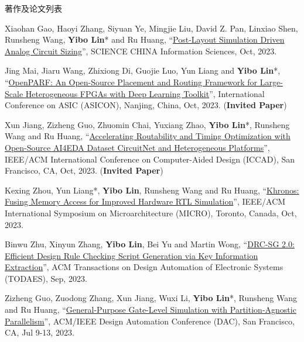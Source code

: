 \begin{rSection}{著作及论文列表}
\begin{description}[font=\normalfont, rightmargin=2em]
{}
            

\item[{[J127]}]{
        Xiaohan Gao, Haoyi Zhang, Siyuan Ye, Mingjie Liu, David Z. Pan, Linxiao Shen, Runsheng Wang, \textbf{Yibo Lin}* and Ru Huang, 
    ``\href{https://doi.org/10.1007/s11432-022-3878-5}{Post-Layout Simulation Driven Analog Circuit Sizing}'', 
    SCIENCE CHINA Information Sciences, Oct, 2023.
    
}
            

\item[{[C126]}]{
        Jing Mai, Jiaru Wang, Zhixiong Di, Guojie Luo, Yun Liang and \textbf{Yibo Lin}*, 
    ``\href{https://doi.org/10.1109/ASICON58565.2023.10396248}{OpenPARF: An Open-Source Placement and Routing Framework for Large-Scale Heterogeneous FPGAs with Deep Learning Toolkit}'', 
    International Conference on ASIC (ASICON), Nanjing, China, Oct, 2023.
    (\textbf{Invited Paper})
}
            

\item[{[C125]}]{
        Xun Jiang, Zizheng Guo, Zhuomin Chai, Yuxiang Zhao, \textbf{Yibo Lin}*, Runsheng Wang and Ru Huang, 
    ``\href{https://doi.org/10.1109/ICCAD57390.2023.10323938}{Accelerating Routability and Timing Optimization with Open-Source AI4EDA Dataset CircuitNet and Heterogeneous Platforms}'', 
    IEEE/ACM International Conference on Computer-Aided Design (ICCAD), San Francisco, CA, Oct, 2023.
    (\textbf{Invited Paper})
}
            

\item[{[C124]}]{
        Kexing Zhou, Yun Liang*, \textbf{Yibo Lin}, Runsheng Wang and Ru Huang, 
    ``\href{https://doi.org/10.1145/3613424.3614301}{Khronos: Fusing Memory Access for Improved Hardware RTL Simulation}'', 
    IEEE/ACM International Symposium on Microarchitecture (MICRO), Toronto, Canada, Oct, 2023.
    
}
            

\item[{[J123]}]{
        Binwu Zhu, Xinyun Zhang, \textbf{Yibo Lin}, Bei Yu and Martin Wong, 
    ``\href{https://doi.org/10.1145/3594666}{DRC-SG 2.0: Efficient Design Rule Checking Script Generation via Key Information Extraction}'', 
    ACM Transactions on Design Automation of Electronic Systems (TODAES), Sep, 2023.
    
}
            

\item[{[C122]}]{
        Zizheng Guo, Zuodong Zhang, Xun Jiang, Wuxi Li, \textbf{Yibo Lin}*, Runsheng Wang and Ru Huang, 
    ``\href{https://doi.org/10.1109/DAC56929.2023.10247907}{General-Purpose Gate-Level Simulation with Partition-Agnostic Parallelism}'', 
    ACM/IEEE Design Automation Conference (DAC), San Francisco, CA, Jul 9-13, 2023.
    
}
\end{description}
\end{rSection}
